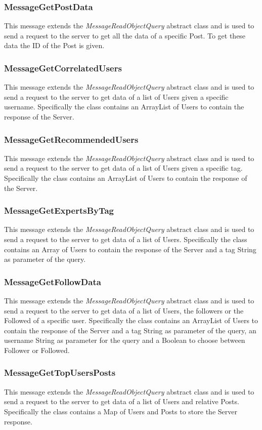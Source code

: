 \documentclass[11pt]{report}
\begin{document}
\subsubsection{MessageGetPostData}
This message extends the \textit{MessageReadObjectQuery} abstract class and is used to send a request to the server to get all the data of a specific Post. To get these data the ID of the Post is given.
\subsubsection{MessageGetCorrelatedUsers}
This message extends the \textit{MessageReadObjectQuery} abstract class and is used to send a request to the server to get data of a list of Users given a specific username. Specifically the class contains an ArrayList of Users to contain the response of the Server.
\subsubsection{MessageGetRecommendedUsers}
This message extends the \textit{MessageReadObjectQuery} abstract class and is used to send a request to the server to get data of a list of Users given a specific tag. Specifically the class contains an ArrayList of Users to contain the response of the Server.
\subsubsection{MessageGetExpertsByTag}
This message extends the \textit{MessageReadObjectQuery} abstract class and is used to send a request to the server to get data of a list of Users. Specifically the class contains an Array of Users to contain the response of the Server and a tag String as parameter of the query.
\newpage
\subsubsection{MessageGetFollowData}
This message extends the \textit{MessageReadObjectQuery} abstract class and is used to send a request to the server to get data of a list of Users, the followers or the Followed of a specific user. Specifically the class contains an ArrayList of Users to contain the response of the Server and a tag String as parameter of the query, an username String as parameter for the query and a Boolean to choose between Follower or Followed.
\subsubsection{MessageGetTopUsersPosts}
This message extends the \textit{MessageReadObjectQuery} abstract class and is used to send a request to the server to get data of a list of Users and relative Posts. Specifically the class contains a Map of Users and Posts to store the Server response.
\end{document}
